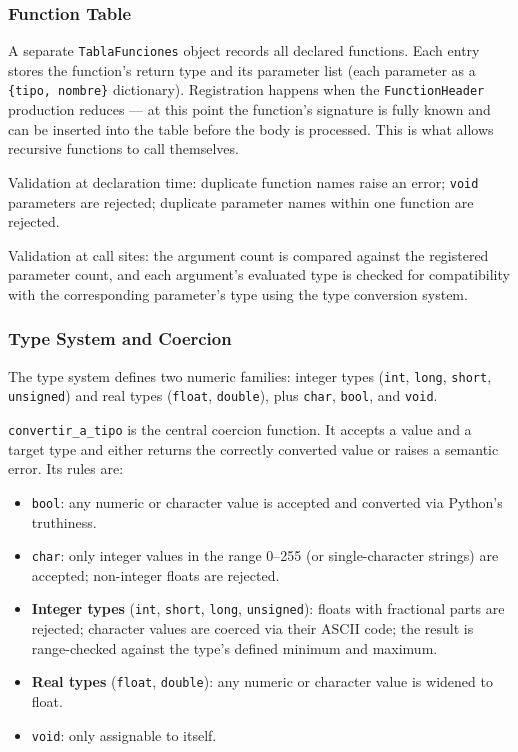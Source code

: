 \documentclass[letterpaper,12pt,oneside]{article}
\begin{document}
\subsubsection{Function Table}
A separate \texttt{TablaFunciones} object records all declared functions. Each entry stores the function's return type and its parameter list (each parameter as a \texttt{\{tipo, nombre\}} dictionary). Registration happens when the \texttt{FunctionHeader} production reduces --- at this point the function's signature is fully known and can be inserted into the table before the body is processed. This is what allows recursive functions to call themselves.

Validation at declaration time: duplicate function names raise an error; \texttt{void} parameters are rejected; duplicate parameter names within one function are rejected.

Validation at call sites: the argument count is compared against the registered parameter count, and each argument's evaluated type is checked for compatibility with the corresponding parameter's type using the type conversion system.

\subsubsection{Type System and Coercion}
The type system defines two numeric families: integer types (\texttt{int}, \texttt{long}, \texttt{short}, \texttt{unsigned}) and real types (\texttt{float}, \texttt{double}), plus \texttt{char}, \texttt{bool}, and \texttt{void}.

\texttt{convertir\_a\_tipo} is the central coercion function. It accepts a value and a target type and either returns the correctly converted value or raises a semantic error. Its rules are:
\begin{itemize}
    \item \texttt{bool}: any numeric or character value is accepted and converted via Python's truthiness.
    \item \texttt{char}: only integer values in the range 0--255 (or single-character strings) are accepted; non-integer floats are rejected.
    \item \textbf{Integer types} (\texttt{int}, \texttt{short}, \texttt{long}, \texttt{unsigned}): floats with fractional parts are rejected; character values are coerced via their ASCII code; the result is range-checked against the type's defined minimum and maximum.
    \item \textbf{Real types} (\texttt{float}, \texttt{double}): any numeric or character value is widened to float.
    \item \texttt{void}: only assignable to itself.
\end{itemize}
\end{document}
